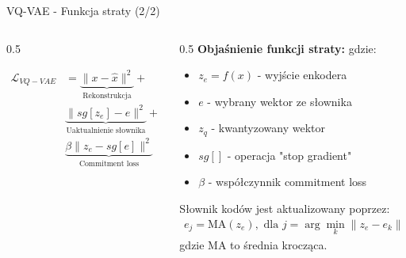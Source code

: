 \documentclass{beamer}
\begin{document}
\begin{frame}{VQ-VAE - Funkcja straty (2/2)}
    \begin{columns}
        \begin{column}{0.5\textwidth}
            \begin{tcolorbox}[colback=yellow!10!white, colframe=black!60, boxrule=0.5pt, arc=3mm]
                \begin{align*}
                    \mathcal{L}_{VQ-VAE} & = \underbrace{\|x - \hat{x}\|^2}_{\text{Rekonstrukcja}} +        \\
                                         & \underbrace{\|sg[z_e] - e\|^2}_{\text{Uaktualnienie słownika}} + \\
                                         & \underbrace{\beta \|z_e - sg[e]\|^2}_{\text{Commitment loss}}
                \end{align*}
            \end{tcolorbox}
        \end{column}
        \begin{column}{0.5\textwidth}
            \textbf{Objaśnienie funkcji straty:}
            \medskip
            gdzie:
            \begin{itemize}
                \item $z_e = f(x)$ - wyjście enkodera
                \item $e$ - wybrany wektor ze słownika
                \item $z_q$ - kwantyzowany wektor
                \item $sg[]$ - operacja "stop gradient"
                \item $\beta$ - współczynnik commitment loss
            \end{itemize}

            Słownik kodów jest aktualizowany poprzez:
            \begin{align*}
                e_j = \text{MA}(z_e), \text{ dla } j = \arg\min_k \|z_e - e_k\|
            \end{align*}
            gdzie MA to średnia krocząca.
        \end{column}
    \end{columns}
\end{frame}
\end{document}
